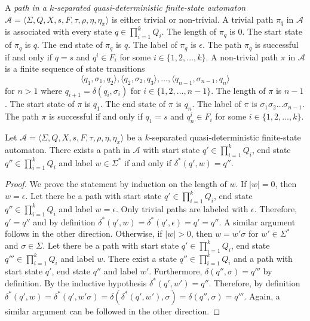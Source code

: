 \begin{definition}
  A \emph{path in a $k$-separated quasi-deterministic finite-state automaton}
  $\mathcal{A} = \langle \Sigma, Q, X, s, F, \tau, \rho, \eta, \eta_x \rangle$ is
  either trivial or non-trivial. A trivial path $\pi_q$ in $\mathcal{A}$ is
  associated with every state $q \in \prod_{i=1}^k Q_i$. The length of $\pi_q$ is $0$.
  The start state of $\pi_q$ is $q$. The end state of $\pi_q$ is $q$. The label of
  $\pi_q$ is $\epsilon$. The path $\pi_q$ is successful if and only if $q = s$ and
  $q^i \in F_i$ for some $i \in \{ 1, 2, \ldots, k \}$. A non-trivial path $\pi$ in
  $\mathcal{A}$ is a finite sequence of state transitions
  \begin{equation*}
    \langle q_1, \sigma_1, q_2 \rangle, \langle q_2, \sigma_2, q_3 \rangle, \dots,
    \langle q_{n-1}, \sigma_{n-1}, q_n \rangle
  \end{equation*}
  for $n > 1$ where $q_{i+1} = \delta(q_i, \sigma_i)$ for $i \in \{ 1, 2, \ldots, n-1
  \}$. The length of $\pi$ is $n-1$. The start state of $\pi$ is $q_1$. The end state
  of $\pi$ is $q_n$. The label of $\pi$ is $\sigma_1 \sigma_2 \ldots \sigma_{n-1}$.
  The path $\pi$ is successful if and only if $q_1 = s$ and $q_n^i \in F_i$ for some
  $i \in \{ 1, 2, \ldots, k \}$.
\end{definition}

\begin{proposition}
  Let $\mathcal{A} = \langle \Sigma, Q, X, s, F, \tau, \rho, \eta, \eta_x \rangle$ be
  a $k$-separated quasi-deterministic finite-state automaton. There exists a path in
  $\mathcal{A}$ with start state $q' \in \prod_{i=1}^k Q_i$, end state $q'' \in
  \prod_{i=1}^k Q_i$ and label $w \in \Sigma^*$ if and only if $\delta^*(q', w) = q''$.
\end{proposition}

\begin{proof}
  We prove the statement by induction on the length of $w$. If $|w| = 0$, then $w =
  \epsilon$. Let there be a path with start state $q' \in \prod_{i=1}^k Q_i$, end state
  $q'' \in \prod_{i=1}^k Q_i$ and label $w = \epsilon$. Only trivial paths are labeled
  with $\epsilon$. Therefore, $q' = q''$ and by definition $\delta^*(q', w) =
  \delta^*(q', \epsilon) = q' = q''$. A similar argument follows in the other
  direction. Otherwise, if $|w| > 0$, then $w = w'\sigma$ for $w' \in \Sigma^*$ and
  $\sigma \in \Sigma$. Let there be a path with start state $q' \in \prod_{i=1}^k Q_i$,
  end state $q''' \in \prod_{i=1}^k Q_i$ and label $w$. There exist a state $q'' \in
  \prod_{i=1}^k Q_i$ and a path with start state $q'$, end state $q''$ and label $w'$.
  Furthermore, $\delta(q'', \sigma) = q'''$ by definition. By the inductive
  hypothesis $\delta^*(q', w') = q''$. Therefore, by definition $\delta^*(q', w) =
  \delta^*(q', w'\sigma) = \delta(\delta^*(q', w'), \sigma) = \delta(q'', \sigma) =
  q'''$. Again, a similar argument can be followed in the other direction.
\end{proof}

